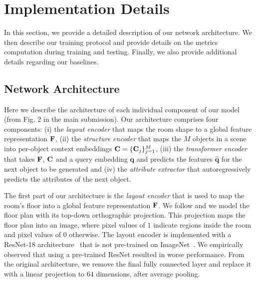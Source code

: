 \documentclass{article}
\newcommand{\bq}{\mathbf{q}}\newcommand{\bQ}{\mathbf{Q}}
\newcommand{\boldparagraph}[1]{\vspace{0.2cm}\noindent{\bf #1:} }
\begin{document}
\section{Implementation Details}

In this section, we provide a detailed description of our network architecture.
We then describe our training protocol and provide
details on the metrics computation during training and testing.
Finally, we also provide additional details regarding our baselines.

\subsection{Network Architecture}
Here we describe the architecture of each individual component of our model
(from Fig. $2$ in the main submission). Our architecture comprises four components:
(i) the \emph{layout encoder} that maps the
room shape to a global feature representation $\mathbf{F}$, (ii) the
\emph{structure encoder} that maps the $M$ objects in a
scene into per-object context embeddings $\mathbf{C}=\{\mathbf{C}_j\}_{j=1}^M$, (iii) the
\emph{transformer encoder} that takes $\mathbf{F}$, $\mathbf{C}$ and a
query embedding $\bq$ and predicts the features $\hat{\bq}$ for the next object
to be generated and (iv) the \emph{attribute extractor} that autoregressively
predicts the attributes of the next object. 

\boldparagraph{Layout Encoder}The first part of our architecture is the \emph{layout encoder} that is used to
map the room's floor into a global feature representation $\mathbf{F}$.
We follow \cite{Wang2018SIGGRAPH} and we model the
floor plan with its top-down orthographic projection. This projection
maps the floor plan into an image, where pixel values of $1$
indicate regions inside the room and pixel values of $0$ otherwise.
The layout encoder is implemented with a ResNet-18
architecture~\cite{He2016CVPR} that is not pre-trained on
ImageNet~\cite{Deng2009CVPR}. We empirically observed that using a pre-trained
ResNet resulted in worse performance.  From the original architecture, we
remove the final fully connected layer and replace it with a linear projection to
$64$ dimensions, after average pooling.
\end{document}
